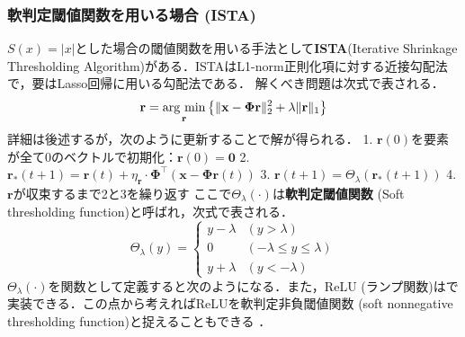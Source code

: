 \subsubsection{軟判定閾値関数を用いる場合 (ISTA)}$S(x)=|x|$とした場合の閾値関数を用いる手法として\textbf{ISTA}(Iterative Shrinkage Thresholding Algorithm)がある．ISTAはL1-norm正則化項に対する近接勾配法で，要はLasso回帰に用いる勾配法である．
解くべき問題は次式で表される．
$$
\mathbf{r} = \mathop{\rm arg~min}\limits_{\mathbf{r}}\left\{\|\mathbf{x}-\mathbf{\Phi}\mathbf{r}\|^2_2+\lambda\|\mathbf{r}\|_1\right\}
$$
詳細は後述するが，次のように更新することで解が得られる．
1. $\mathbf{r}(0)$を要素が全て0のベクトルで初期化：$\mathbf{r}(0)=\mathbf{0}$
2. $\mathbf{r}_*(t+1)=\mathbf{r}(t)+\eta_\mathbf{r}\cdot \mathbf{\Phi}^\top(\mathbf{x}-\mathbf{\Phi}\mathbf{r}(t))$
3. $\mathbf{r}(t+1) = \Theta_\lambda(\mathbf{r}_*(t+1))$
4. $\mathbf{r}$が収束するまで2と3を繰り返す
ここで$\Theta_\lambda(\cdot)$は\textbf{軟判定閾値関数} (Soft thresholding function)と呼ばれ，次式で表される．
$$
\Theta_\lambda(y)= 
\begin{cases} 
y-\lambda & (y>\lambda)\\ 
0 & (-\lambda\leq y\leq\lambda)\\ 
 y+\lambda & (y<-\lambda) 
\end{cases}
$$
$\Theta_\lambda(\cdot)$を関数として定義すると次のようになる．また，ReLU (ランプ関数)はで実装できる．この点から考えればReLUを軟判定非負閾値関数 (soft nonnegative thresholding function)と捉えることもできる \cite{Papyan2018-yr}．